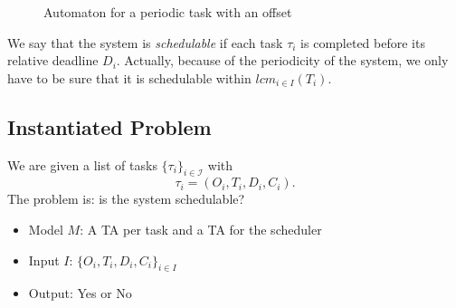 \documentclass{article}
\begin{document}
\begin{figure}[!ht]
\centering
\label{fig:cyclic_task}
%    
 \caption{Automaton for a periodic task with an offset}
\end{figure}
We say that the system is \emph{schedulable} if each task $\tau_i$ is completed before its relative deadline $D_i$. Actually, because of the periodicity
of the system, we only have to be sure that it is schedulable within $lcm_{i\in I}(T_i)$.
% 
% 

\subsection{Instantiated Problem}
We are given a list of tasks $\{\tau_i\}_{i \in \mathcal{I}}$ with $$\tau_i=(O_i,T_i,D_i,C_i).$$ 
The problem is: is the system schedulable? 
\begin{itemize}
 \item Model $M$: A TA per task and a TA for the scheduler
 \item Input $I$: $\{O_i,T_i,D_i,C_i\}_{i \in I}$
 \item Output: Yes or No
\end{itemize}
\end{document}
